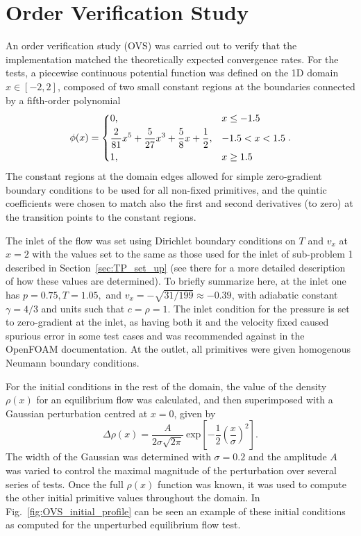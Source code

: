 \section{Order Verification Study}
\label{sec:OVS}

An order verification study (OVS) was carried out to verify that the implementation matched the theoretically expected convergence rates. For the tests, a piecewise continuous potential function was defined on the 1D domain $x\in[-2,2]$, composed of two small constant regions at the boundaries connected by a fifth-order polynomial
\begin{equation}
\phi(x)=
\begin{dcases} 
      0, & x\leq -1.5 \\
      \frac{2}{81}x^5+\frac{5}{27}x^3+\frac{5}{8}x+\frac{1}{2}, & -1.5<x<1.5 \\
      1, & x\geq 1.5
\end{dcases}.
\end{equation}
The constant regions at the domain edges allowed for simple zero-gradient boundary conditions to be used for all non-fixed primitives, and the quintic coefficients were chosen to match also the first and second derivatives (to zero) at the transition points to the constant regions.

The inlet of the flow was set using Dirichlet boundary conditions on $T$ and $v_x$ at $x=2$ with the values set to the same as those used for the inlet of sub-problem 1 described in Section~\ref{sec:TP_set_up} (see there for a more detailed description of how these values are determined). To briefly summarize here, at the inlet one has $p=0.75, T=1.05,$ and $v_x=-\sqrt{31/199}\approx-0.39$, with adiabatic constant $\gamma=4/3$ and units such that $c=\rho=1$. The inlet condition for the pressure is set to zero-gradient at the inlet, as having both it and the velocity fixed caused spurious error in some test cases and was recommended against in the OpenFOAM documentation. At the outlet, all primitives were given homogenous Neumann boundary conditions.

For the initial conditions in the rest of the domain, the value of the density $\rho(x)$ for an  equilibrium flow was calculated, and then superimposed with a Gaussian perturbation centred at $x=0$, given by
\begin{equation}
\Delta \rho(x)=\frac{A}{2\sigma \sqrt{2 \pi}}\ \textrm{exp}\left[-\frac{1}{2}\left(\frac{x}{\sigma}\right)^2\right].
\end{equation}
The width of the Gaussian was determined with $\sigma=0.2$ and the amplitude $A$ was varied to control the maximal magnitude of the perturbation over several series of tests. Once the full $\rho(x)$ function was known, it was used to compute the other initial primitive values throughout the domain. In Fig.~\ref{fig:OVS_initial_profile} can be seen an example of these initial conditions as computed for the unperturbed equilibrium flow test.

